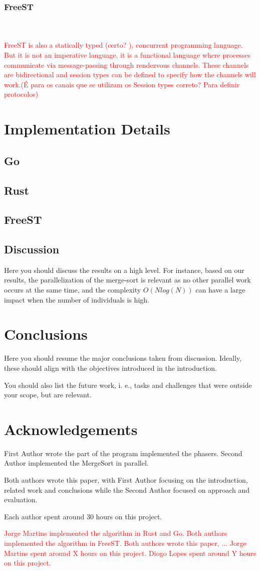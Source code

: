 \documentclass[runningheads]{llncs}
\begin{document}
\subsubsection{FreeST}\hfill\\\\
\textcolor{red}{FreeST is also a statically typed (certo?	), concurrent programming language. But it is not an imperative language, it is a functional language where processes communicate via message-passing through rendezvous channels. These channels are bidirectional and session types can be defined to specify how the channels will work.(É para os canais que se utilizam os Session types correto? Para definir protocolos)}
\section{Implementation Details}
\lipsum[1]
\subsection{Go}
\lipsum[1]
\subsection{Rust}
\lipsum[1]
\subsection{FreeST}
\lipsum[1]
\subsection{Discussion}
Here you should discuss the results on a high level. For instance, based on our results, the parallelization of the merge-sort is relevant as no other parallel work occurs at the same time, and the complexity $O(N log(N))$ can have a large impact when the number of individuals is high.
\section{Conclusions}
Here you should resume the major conclusions taken from discussion. Ideally, these should align with the objectives introduced in the introduction.


You should also list the future work, i. e., tasks and challenges that were outside your scope, but are relevant.
\section*{Acknowledgements}
First Author wrote the part of the program implemented the phasers. Second Author implemented the MergeSort in parallel. 

Both authors wrote this paper, with First Author focusing on the introduction, related work and conclusions while the Second Author focused on approach and evaluation.

Each author spent around 30 hours on this project.

\textcolor{red}{Jorge Martins implemented the algorithm in Rust and Go. Both authors implemented the algorithm in FreeST.
Both authors wrote this paper, ... 
Jorge Martins spent around X hours on this project. Diogo Lopes spent around Y hours on this project.}


\end{document}
